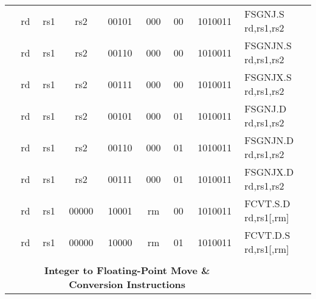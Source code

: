 \begin{table}[p]
\begin{small}
\begin{center}
\begin{tabular}{rccccccccccl}
&
\multicolumn{1}{|c|}{rd} &
\multicolumn{1}{c|}{rs1} &
\multicolumn{1}{c|}{rs2} &
\multicolumn{3}{c|}{00101} &
\multicolumn{2}{c|}{000} &
\multicolumn{1}{c|}{00} &
\multicolumn{1}{c|}{1010011} & FSGNJ.S rd,rs1,rs2 \\
\cline{2-11}
  

&
\multicolumn{1}{|c|}{rd} &
\multicolumn{1}{c|}{rs1} &
\multicolumn{1}{c|}{rs2} &
\multicolumn{3}{c|}{00110} &
\multicolumn{2}{c|}{000} &
\multicolumn{1}{c|}{00} &
\multicolumn{1}{c|}{1010011} & FSGNJN.S rd,rs1,rs2 \\
\cline{2-11}
  

&
\multicolumn{1}{|c|}{rd} &
\multicolumn{1}{c|}{rs1} &
\multicolumn{1}{c|}{rs2} &
\multicolumn{3}{c|}{00111} &
\multicolumn{2}{c|}{000} &
\multicolumn{1}{c|}{00} &
\multicolumn{1}{c|}{1010011} & FSGNJX.S rd,rs1,rs2 \\
\cline{2-11}
  

&
\multicolumn{1}{|c|}{rd} &
\multicolumn{1}{c|}{rs1} &
\multicolumn{1}{c|}{rs2} &
\multicolumn{3}{c|}{00101} &
\multicolumn{2}{c|}{000} &
\multicolumn{1}{c|}{01} &
\multicolumn{1}{c|}{1010011} & FSGNJ.D rd,rs1,rs2 \\
\cline{2-11}
  

&
\multicolumn{1}{|c|}{rd} &
\multicolumn{1}{c|}{rs1} &
\multicolumn{1}{c|}{rs2} &
\multicolumn{3}{c|}{00110} &
\multicolumn{2}{c|}{000} &
\multicolumn{1}{c|}{01} &
\multicolumn{1}{c|}{1010011} & FSGNJN.D rd,rs1,rs2 \\
\cline{2-11}
  

&
\multicolumn{1}{|c|}{rd} &
\multicolumn{1}{c|}{rs1} &
\multicolumn{1}{c|}{rs2} &
\multicolumn{3}{c|}{00111} &
\multicolumn{2}{c|}{000} &
\multicolumn{1}{c|}{01} &
\multicolumn{1}{c|}{1010011} & FSGNJX.D rd,rs1,rs2 \\
\cline{2-11}
  

&
\multicolumn{1}{|c|}{rd} &
\multicolumn{1}{c|}{rs1} &
\multicolumn{1}{c|}{00000} &
\multicolumn{3}{c|}{10001} &
\multicolumn{2}{c|}{rm} &
\multicolumn{1}{c|}{00} &
\multicolumn{1}{c|}{1010011} & FCVT.S.D rd,rs1[,rm] \\
\cline{2-11}
  

&
\multicolumn{1}{|c|}{rd} &
\multicolumn{1}{c|}{rs1} &
\multicolumn{1}{c|}{00000} &
\multicolumn{3}{c|}{10000} &
\multicolumn{2}{c|}{rm} &
\multicolumn{1}{c|}{01} &
\multicolumn{1}{c|}{1010011} & FCVT.D.S rd,rs1[,rm] \\
\cline{2-11}
  

&
\multicolumn{10}{c}{} & \\
&
\multicolumn{10}{c}{\bf Integer to Floating-Point Move \& Conversion Instructions} & \\
\cline{2-11}
  


\end{tabular}
\end{center}
\end{small}
\end{table}

